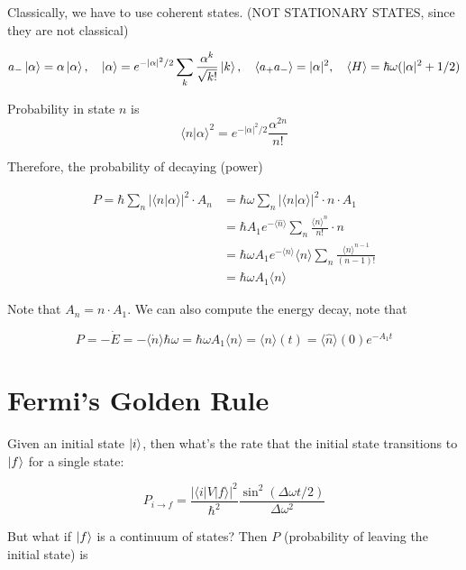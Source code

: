 \documentclass{article}
\newtheorem{one minute paper}[theorem]{One Minute Paper}
\begin{document}
Classically, we have to use coherent states. (NOT STATIONARY STATES, since they are not classical)

\begin{equation}
    a_{-}\ket{\alpha} = \alpha\ket{\alpha}, \quad \ket{\alpha} = e^{-|\alpha|^2/2}\sum_{k}\frac{\alpha^k}{\sqrt{k!}}\ket{k}, \quad \langle a_{+}a_{-} \rangle = |\alpha|^2, \quad \langle H \rangle = \hbar \omega(|\alpha|^2 + 1/2)
\end{equation}

Probability in state $n$ is $$\langle n | \alpha \rangle^2 = e^{-|\alpha|^2/2}\frac{\alpha^{2n}}{n!}$$ 

Therefore, the probability of decaying (power) 

\begin{align*}
    P = \hbar \sum_n |\langle n | \alpha \rangle |^2 \cdot A_n &= \hbar \omega \sum_n | \langle n | \alpha \rangle |^2 \cdot n \cdot A_1 \\
    &= \hbar A_1 e^{-\langle \hat{n} \rangle}\sum_n \frac{\langle n \rangle^n}{n!}\cdot n \\
    &= \hbar \omega A_1 e^{-\langle n \rangle} \langle n \rangle \sum_{n}\frac{\langle n \rangle^{n-1}}{(n-1)!} \\
    &= \hbar \omega A_1 \langle n \rangle
\end{align*}

Note that $A_n = n \cdot A_1$. We can also compute the energy decay, note that 

\begin{equation}
    P = -\dot{E} = -\langle \dot{n} \rangle \hbar \omega = \hbar \omega A_1 \langle n \rangle = \langle n \rangle(t) = \langle\hat{n}\rangle(0)e^{-A_1t}
\end{equation}

\section*{Fermi's Golden Rule}

Given an initial state $\ket{i}$, then what's the rate that the initial state transitions to $\ket{f}$ for a single state: 

\begin{equation}
    P_{i\rightarrow f} = \frac{| \langle i | V | f \rangle|^2}{\hbar^2}\frac{\sin^2(\Delta\omega t/2)}{\Delta \omega^2}
\end{equation}

But what if $\ket{f}$ is a continuum of states? Then $P$ (probability of leaving the initial state) is
\end{document}
